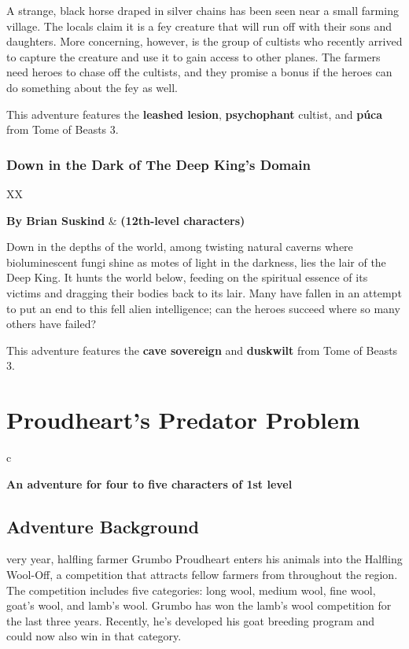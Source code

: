\documentclass[10pt,a4paper,twoside,bg=print,twocolumn,openany,nodeprecatedcode]{dndbook}
\begin{document}
A strange, black horse draped in silver chains has been seen near a small farming village. The locals claim it is a fey creature that will run off with their sons and daughters. More concerning, however, is the group of cultists who recently arrived to capture the creature and use it to gain access to other planes. The farmers need heroes to chase off the cultists, and they promise a bonus if the heroes can do something about the fey as well.

This adventure features the \textbf{leashed lesion}, \textbf{psychophant} cultist, and \textbf{púca} from Tome of Beasts 3.

\subsection{Down in the Dark of The Deep King's Domain}

\begin{DndTable}{XX}

\textbf{By Brian Suskind} & \textbf{(12th-level characters)}\\
\end{DndTable}

Down in the depths of the world, among twisting natural caverns where bioluminescent fungi shine as motes of light in the darkness, lies the lair of the Deep King. It hunts the world below, feeding on the spiritual essence of its victims and dragging their bodies back to its lair. Many have fallen in an attempt to put an end to this fell alien intelligence; can the heroes succeed where so many others have failed?

This adventure features the \textbf{cave sovereign} and \textbf{duskwilt} from Tome of Beasts 3.

\chapter{Proudheart's Predator Problem}

\begin{DndTable}{c}

\textbf{An adventure for four to five characters of 1st level}\\
\end{DndTable}

\section{Adventure Background}
very year, halfling farmer Grumbo Proudheart enters his animals into the Halfling Wool-Off, a competition that attracts fellow farmers from throughout the region. The competition includes five categories: long wool, medium wool, fine wool, goat's wool, and lamb's wool. Grumbo has won the lamb's wool competition for the last three years. Recently, he's developed his goat breeding program and could now also win in that category.
\end{document}
